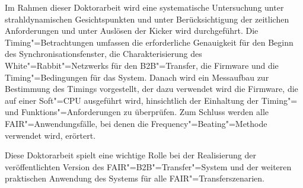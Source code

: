 Im Rahmen dieser Doktorarbeit wird eine systematische Untersuchung unter strahldynamischen Gesichtspunkten und unter Ber\"ucksichtigung der zeitlichen Anforderungen und unter Ausl\"osen der Kicker wird durchgef\"uhrt. Die Timing"=Betrachtungen umfassen die erforderliche Genauigkeit f\"ur den Beginn des Synchronisationsfenster, die Charakterisierung des White"=Rabbit"=Netzwerks f\"ur den B2B"=Transfer, die Firmware und die Timing"=Bedingungen f\"ur das System. Danach wird ein Messaufbau zur Bestimmung des Timings vorgestellt, der dazu verwendet wird die Firmware, die auf einer Soft"=CPU ausgef\"uhrt wird, hinsichtlich der Einhaltung der Timing"= und Funktions"=Anforderungen zu \"uberpr\"ufen. Zum Schluss werden alle FAIR"=Anwendungsf\"alle, bei denen die Frequency"=Beating"=Methode verwendet wird, er\"ortert.

Diese Doktorarbeit spielt eine wichtige Rolle bei der Realisierung der ver\"offentlichten Version des FAIR"=B2B"=Transfer"=System und der weiteren praktischen Anwendung des Systems f\"ur alle FAIR"=Transferszenarien.


